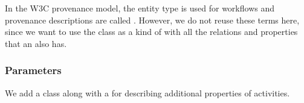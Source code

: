 In the W3C provenance model, the entity type  is used for workflows and 
provenance descriptions are called . However, we do not reuse these 
terms here, since we want to use the class  as a kind of 
with all the relations and properties that an  also has. 



%




\subsubsection{Parameters}
We add a  class along with a  
for describing additional properties of activities.

